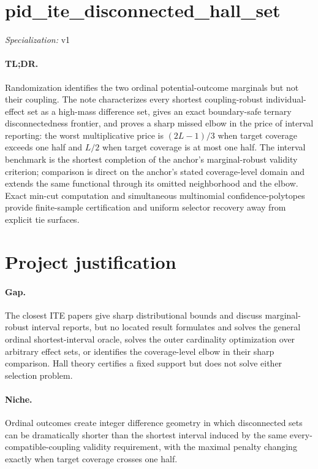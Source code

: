 \documentclass{article}
\begin{document}
\sloppy

\section*{pid\_\allowbreak{}ite\_\allowbreak{}disconnected\_\allowbreak{}hall\_\allowbreak{}set}

\noindent\textit{Specialization:} v1\par

\paragraph{TL;DR.} Randomization identifies the two ordinal potential-outcome marginals but not their coupling. The note characterizes every shortest coupling-robust individual-effect set as a high-mass difference set, gives an exact boundary-safe ternary disconnectedness frontier, and proves a sharp missed elbow in the price of interval reporting: the worst multiplicative price is \((2L-1)/3\) when target coverage exceeds one half and \(L/2\) when target coverage is at most one half. The interval benchmark is the shortest completion of the anchor's marginal-robust validity criterion; comparison is direct on the anchor's stated coverage-level domain and extends the same functional through its omitted neighborhood and the elbow. Exact min-cut computation and simultaneous multinomial confidence-polytopes provide finite-sample certification and uniform selector recovery away from explicit tie surfaces.

\section{Project justification}

\paragraph{Gap.} The closest ITE papers give sharp distributional bounds and discuss marginal-robust interval reports, but no located result formulates and solves the general ordinal shortest-interval oracle, solves the outer cardinality optimization over arbitrary effect sets, or identifies the coverage-level elbow in their sharp comparison. Hall theory certifies a fixed support but does not solve either selection problem.

\paragraph{Niche.} Ordinal outcomes create integer difference geometry in which disconnected sets can be dramatically shorter than the shortest interval induced by the same every-compatible-coupling validity requirement, with the maximal penalty changing exactly when target coverage crosses one half.
\end{document}
